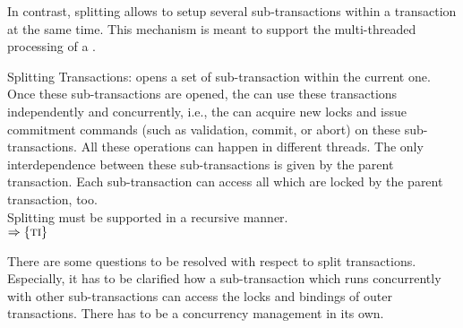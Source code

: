 \documentclass[a4paper, 12pt]{book}
\newcommand{\INTERFACE}[1]{$\Rightarrow\left\{#1\right\}$}
\begin{document}
In contrast, splitting allows to setup several sub-transactions within a
transaction at the same time. This mechanism is meant to support the
multi-threaded processing of a . 
%
\begin{requirement*}{Splitting Transactions: \dbaiTRSPLIT}
  \dbaiTRSPLIT opens a set of sub-transaction within the current one. 
  Once these sub-transactions are opened, the  can use
  these transactions independently and concurrently, i.e., the 
  can acquire new locks and issue commitment commands (such as
  validation, commit, or abort) on these sub-transactions. All these
  operations can happen in different threads. 
  The only interdependence between these sub-transactions is given by
  the parent transaction. Each sub-transaction can access all
   which are locked by the parent transaction, too.\\
  Splitting must be supported in a recursive manner.\\
  \INTERFACE{\TRANSACTION}
\end{requirement*}
%
There are some questions to be resolved with respect to split
transactions. Especially, it has to be clarified how a sub-transaction which
runs concurrently with other sub-transactions can access the locks and
bindings of outer transactions. There has to be a concurrency management in
its own. 
\end{document}
